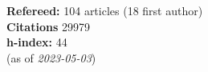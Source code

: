 \textbf{Refereed:} 104 articles (18 first author)\\\textbf{Citations} 29979\\\textbf{h-index:} 44\\(as of \textit{2023-05-03})